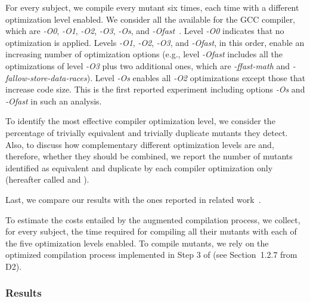 For every subject, we compile every mutant six times, each time with a different optimization level enabled. We consider all the available  for the GCC compiler, which are \emph{-O0}, \emph{-O1}, \emph{-O2}, \emph{-O3}, \emph{-Os},
and \emph{-Ofast}~\cite{GCCopt}. Level \emph{-O0} indicates that no optimization is applied. Levels \emph{-O1}, \emph{-O2}, \emph{-O3}, and \emph{-Ofast}, in this order, enable an increasing number of optimization options (e.g., level \emph{-Ofast} includes all the optimizations of level \emph{-O3} plus two additional ones, which are \emph{-ffast-math} and \emph{-fallow-store-data-races}). Level \emph{-Os} enables all \emph{-O2} optimizations except those that increase code size. This is the first reported experiment including options \emph{-Os} and \emph{-Ofast} in such an analysis.
 

To identify the most effective compiler optimization level, we consider the percentage of trivially equivalent and trivially duplicate mutants they detect. Also, to discuss how complementary different optimization levels  are and, therefore, whether they should be combined, we report the number of mutants identified as equivalent and duplicate by each compiler optimization only (hereafter called  and ). 

Last, we compare our results with the ones reported in related work~\cite{papadakis2015trivial}.

To estimate the costs entailed by the augmented compilation process, we collect, for every subject, the time required for compiling all their mutants with each of the five optimization levels enabled. To compile mutants, we rely on the optimized compilation process implemented in Step 3 of \APPR (see Section~1.2.7 from D2).



\subsubsection{Results}

